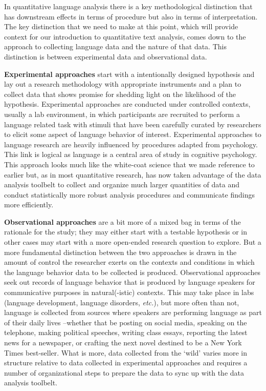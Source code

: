 \documentclass[
  letterpaper,
  DIV=11,
  numbers=noendperiod]{scrreprt}
\theoremstyle{definition}
\theoremstyle{remark}
\begin{document}
In quantitative language analysis there is a key methodological
distinction that has downstream effects in terms of procedure but also
in terms of interpretation. The key distinction that we need to make at
this point, which will provide context for our introduction to
quantitative text analysis, comes down to the approach to collecting
language data and the nature of that data. This distinction is between
experimental data and observational data.

\textbf{Experimental approaches} start with a
intentionally designed hypothesis and lay out a research methodology
with appropriate instruments and a plan to collect data that shows
promise for shedding light on the likelihood of the hypothesis.
Experimental approaches are conducted under controlled contexts, usually
a lab environment, in which participants are recruited to perform a
language related task with stimuli that have been carefully curated by
researchers to elicit some aspect of language behavior of interest.
Experimental approaches to language research are heavily influenced by
procedures adapted from psychology. This link is logical as language is
a central area of study in cognitive psychology. This approach looks
much like the white-coat science that we made reference to earlier but,
as in most quantitative research, has now taken advantage of the data
analysis toolbelt to collect and organize much larger quantities of data
and conduct statistically more robust analysis procedures and
communicate findings more efficiently.

\textbf{Observational approaches} are a bit
more of a mixed bag in terms of the rationale for the study; they may
either start with a testable hypothesis or in other cases may start with
a more open-ended research question to explore. But a more fundamental
distinction between the two approaches is drawn in the amount of control
the researcher exerts on the contexts and conditions in which the
language behavior data to be collected is produced. Observational
approaches seek out records of language behavior that is produced by
language speakers for communicative purposes in natural(-istic)
contexts. This may take place in labs (language development, language
disorders, \emph{etc.}), but more often than not, language is collected
from sources where speakers are performing language as part of their
daily lives --whether that be posting on social media, speaking on the
telephone, making political speeches, writing class essays, reporting
the latest news for a newspaper, or crafting the next novel destined to
be a New York Times best-seller. What is more, data collected from the
`wild' varies more in structure relative to data collected in
experimental approaches and requires a number of organizational steps to
prepare the data to sync up with the data analysis toolbelt.
\end{document}
